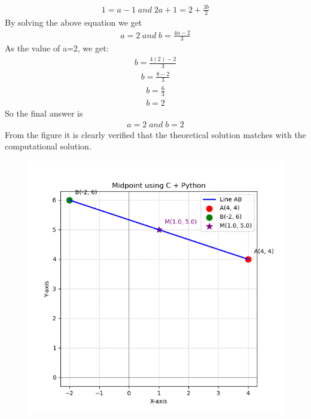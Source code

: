 \documentclass[journal]{IEEEtran}
\theoremstyle{remark}
\begin{document}
\begin{align}
    1=a-1 \;and\;2a+1=2+\frac{3b}{2}
\end{align}
By solving the above equation we get 
\begin{align}
    a=2\;and\;b=\frac{4a-2}{3}
\end{align}
As the value of a=2, we get:
\begin{align}
b=\frac{4(2)-2}{3} 
\end{align}
\begin{align}
b=\frac{8-2}{3}
\end{align}
\begin{align}
b=\frac{6}{3}
\end{align}
\begin{align}
    b=2
\end{align}
So the final answer is
\begin{align}
    a=2\;and \;b=2
\end{align}
From the figure it is clearly verified that the theoretical solution matches with the computational solution.\\
\begin{figure}[h]
    \centering
    \includegraphics[height=0.5\textheight, keepaspectratio]{figs/figure1.png}
    \label{figure_1}
\end{figure}
\end{document}
